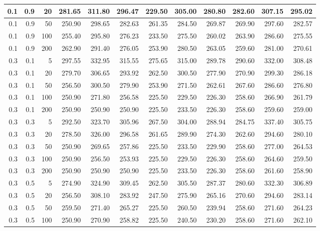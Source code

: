 \begin{longtable}{|r|r|r|r|r|r|r|r|r|r|r|r|}
		\hline
		0.1 & 0.9 & 20 & 281.65 & 311.80 & 296.47 & 229.50 & 305.00 & 280.80 & 282.60 & 307.15 & 295.02\\
		\hline
		0.1 & 0.9 & 50 & 250.90 & 298.65 & 282.63 & 261.35 & 284.50 & 269.87 & 269.90 & 297.60 & 282.57\\
		\hline
		0.1 & 0.9 & 100 & 255.40 & 295.80 & 276.23 & 233.50 & 275.50 & 260.02 & 263.90 & 286.60 & 275.55\\
		\hline
		0.1 & 0.9 & 200 & 262.90 & 291.40 & 276.05 & 253.90 & 280.50 & 263.05 & 259.60 & 281.00 & 270.61\\
		\hline
		0.3 & 0.1 & 5 & 297.55 & 332.95 & 315.55 & 275.65 & 315.00 & 289.78 & 290.60 & 332.00 & 308.48\\
		\hline
		0.3 & 0.1 & 20 & 279.70 & 306.65 & 293.92 & 262.50 & 300.50 & 277.90 & 270.90 & 299.30 & 286.18\\
		\hline
		0.3 & 0.1 & 50 & 256.50 & 300.50 & 279.90 & 253.90 & 271.50 & 262.61 & 267.60 & 286.60 & 276.80\\
		\hline
		0.3 & 0.1 & 100 & 250.90 & 271.80 & 256.58 & 225.50 & 229.50 & 226.30 & 258.60 & 266.90 & 261.79\\
		\hline
		0.3 & 0.1 & 200 & 250.90 & 250.90 & 250.90 & 225.50 & 233.50 & 226.30 & 258.60 & 259.60 & 259.00\\
		\hline
		0.3 & 0.3 & 5 & 292.50 & 323.70 & 305.96 & 267.50 & 304.00 & 288.94 & 284.75 & 337.40 & 305.75\\
		\hline
		0.3 & 0.3 & 20 & 278.50 & 326.00 & 296.58 & 261.65 & 289.90 & 274.30 & 262.60 & 294.60 & 280.10\\
		\hline
		0.3 & 0.3 & 50 & 250.90 & 269.65 & 257.86 & 225.50 & 233.50 & 229.90 & 258.60 & 277.00 & 264.53\\
		\hline
		0.3 & 0.3 & 100 & 250.90 & 256.50 & 253.93 & 225.50 & 229.50 & 226.30 & 258.60 & 264.60 & 259.50\\
		\hline
		0.3 & 0.3 & 200 & 250.90 & 250.90 & 250.90 & 225.50 & 233.50 & 226.30 & 258.60 & 261.60 & 258.90\\
		\hline
		0.3 & 0.5 & 5 & 274.90 & 324.90 & 309.45 & 262.50 & 305.50 & 287.37 & 280.60 & 332.30 & 306.89\\
		\hline
		0.3 & 0.5 & 20 & 256.50 & 308.10 & 283.92 & 247.50 & 275.90 & 265.16 & 270.60 & 294.60 & 283.14\\
		\hline
		0.3 & 0.5 & 50 & 259.50 & 271.40 & 265.27 & 225.50 & 260.50 & 239.94 & 258.60 & 271.60 & 264.23\\
		\hline
		0.3 & 0.5 & 100 & 250.90 & 270.90 & 258.82 & 225.50 & 240.50 & 230.20 & 258.60 & 271.60 & 262.10\\

\end{longtable}
